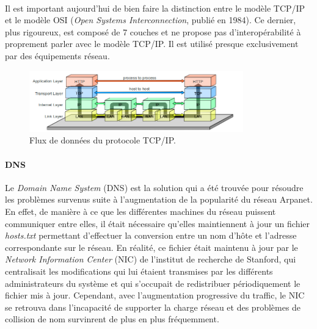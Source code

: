 \paragraph{} Il est important aujourd'hui de bien faire la distinction entre le modèle TCP/IP et le modèle OSI 
(\emph{Open Systems Interconnection}, publié en 1984). Ce dernier, plus rigoureux, est composé de 7 couches et ne
propose pas d'interopérabilité à proprement parler avec le modèle TCP/IP. Il est utilisé presque exclusivement par des
équipements réseau.

\begin{figure}[ht]
    \centering
    \includegraphics[width=350px]{chapters/01/images/tcpip_dataflow.png}
    \caption{\label{tcpip_dataflow}Flux de données du protocole TCP/IP.}
\end{figure}

\paragraph{DNS} Le \emph{Domain Name System} (DNS) est la solution qui a été trouvée pour résoudre les problèmes survenus
suite à l'augmentation de la popularité du réseau Arpanet. En effet, de manière à ce que les différentes machines du 
réseau puissent communiquer entre elles, il était nécessaire qu'elles maintiennent à jour un fichier \emph{hosts.txt}
permettant d'effectuer la conversion entre un nom d'hôte et l'adresse correspondante sur le réseau. En réalité, ce fichier
était maintenu à jour par le \emph{Network Information Center} (NIC) de l'institut de recherche de Stanford, qui centralisait
les modifications qui lui étaient transmises par les différents administrateurs du système et qui s'occupait de redistribuer
périodiquement le fichier mis à jour. Cependant, avec l'augmentation progressive du traffic, le NIC se retrouva dans
l'incapacité de supporter la charge réseau et des problèmes de collision de nom survinrent de plus en plus fréquemment.

